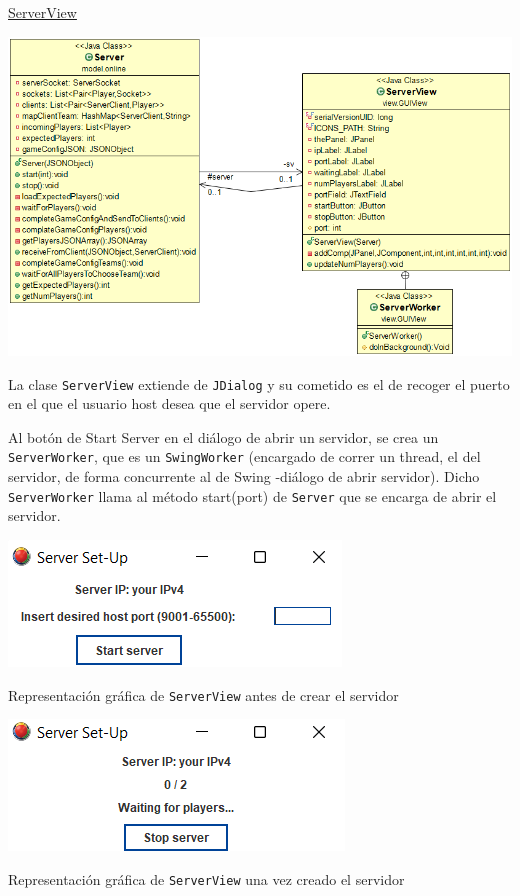\documentclass[12pt,a4paper,openright]{book}
\theoremstyle{break}
\begin{document}
\underline{ServerView}
\begin{center}
\includegraphics[scale=0.55]{serverviewuml.png}
\end{center}

La clase \texttt{ServerView} extiende de \texttt{JDialog} y su cometido es el de recoger el puerto en el que el usuario host desea que el servidor opere.

Al botón de Start Server en el diálogo de abrir un servidor, se crea un \texttt{ServerWorker}, que es un \texttt{SwingWorker} (encargado de correr un thread, el del servidor, de forma concurrente al de Swing -diálogo de abrir servidor). Dicho \texttt{ServerWorker} llama al método start(port) de \texttt{Server} que se encarga de abrir el servidor.

\begin{center}
\includegraphics[scale=1]{serversetup.png}

Representación gráfica de \texttt{ServerView} antes de crear el servidor

\end{center}

\begin{center}
\includegraphics[scale=1]{waitingserver.png}

Representación gráfica de \texttt{ServerView} una vez creado el servidor
\end{center}
\end{document}
